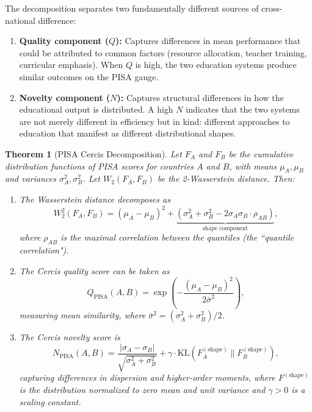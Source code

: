 \documentclass[12pt,a4paper]{article}
\newtheorem{theorem}{Theorem}[section]
\theoremstyle{remark}
\begin{document}
The decomposition separates two fundamentally different sources of cross-national difference:

\begin{enumerate}
    \item \textbf{Quality component ($Q$):} Captures differences in mean performance that could be attributed to common factors (resource allocation, teacher training, curricular emphasis). When $Q$ is high, the two education systems produce similar outcomes on the PISA gauge.

    \item \textbf{Novelty component ($N$):} Captures structural differences in how the educational output is distributed. A high $N$ indicates that the two systems are not merely different in efficiency but in kind: different approaches to education that manifest as different distributional shapes.
\end{enumerate}

\begin{theorem}[PISA Cercis Decomposition]
\label{thm:pisa}
Let $F_A$ and $F_B$ be the cumulative distribution functions of PISA scores for countries $A$ and $B$, with means $\mu_A, \mu_B$ and variances $\sigma_A^2, \sigma_B^2$. Let $W_2(F_A, F_B)$ be the 2-Wasserstein distance. Then:
\begin{enumerate}
    \item The Wasserstein distance decomposes as
    \begin{equation}
    W_2^2(F_A, F_B) = (\mu_A - \mu_B)^2 + \underbrace{\left( \sigma_A^2 + \sigma_B^2 - 2\sigma_A\sigma_B \cdot \rho_{AB} \right)}_{\text{shape component}},
    \label{eq:wasserstein_decomp}
    \end{equation}
    where $\rho_{AB}$ is the maximal correlation between the quantiles (the ``quantile correlation").

    \item The Cercis quality score can be taken as
    \begin{equation}
    Q_{\text{PISA}}(A, B) = \exp\left(-\frac{(\mu_A - \mu_B)^2}{2\bar{\sigma}^2}\right),
    \label{eq:pisa_q}
    \end{equation}
    measuring mean similarity, where $\bar{\sigma}^2 = (\sigma_A^2 + \sigma_B^2)/2$.

    \item The Cercis novelty score is
    \begin{equation}
    N_{\text{PISA}}(A, B) = \frac{|\sigma_A - \sigma_B|}{\sqrt{\sigma_A^2 + \sigma_B^2}} + \gamma \cdot \text{KL}(F_A^{(\text{shape})} \| F_B^{(\text{shape})}),
    \label{eq:pisa_n}
    \end{equation}
    capturing differences in dispersion and higher-order moments, where $F^{(\text{shape})}$ is the distribution normalized to zero mean and unit variance and $\gamma > 0$ is a scaling constant.
\end{enumerate}
\end{theorem}
\end{document}
